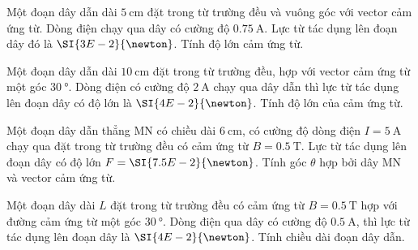 \begin{ex}
	Một đoạn dây dẫn dài $\SI{5}{\centi\meter}$ đặt trong từ trường đều và vuông góc với vector cảm ứng từ. Dòng điện chạy qua dây có cường độ $\SI{0.75}{\ampere}$. Lực từ tác dụng lên đoạn dây đó là $\SI{3E-2}{\newton}$. Tính độ lớn cảm ứng từ.
\end{ex}
\begin{ex}
	Một đoạn dây dẫn dài $\SI{10}{\centi\meter}$ đặt trong từ trường đều, hợp với vector cảm ứng từ một góc $\SI{30}{\degree}$. Dòng điện có cường độ $\SI{2}{\ampere}$ chạy qua dây dẫn thì lực từ tác dụng lên đoạn dây có độ lớn là $\SI{4E-2}{\newton}$. Tính độ lớn của cảm ứng từ.
\end{ex}
\begin{ex}
	Một đoạn dây dẫn thẳng MN có chiều dài $\SI{6}{\centi\meter}$, có cường độ dòng điện $I=\SI{5}{\ampere}$ chạy qua đặt trong từ trường đều có cảm ứng từ $B=\SI{0.5}{\tesla}$. Lực từ tác dụng lên đoạn dây có độ lớn $F=\SI{7.5E-2}{\newton}$. Tính góc $\theta$ hợp bởi dây MN và vector cảm ứng từ.	
\end{ex}
\begin{ex}
	Một đoạn dây dài $L$ đặt trong từ trường đều có cảm ứng từ $B=\SI{0.5}{\tesla}$ hợp với đường cảm ứng từ một góc $\SI{30}{\degree}$. Dòng điện qua dây có cường độ $\SI{0.5}{\ampere}$, thì lực từ tác dụng lên đoạn dây là $\SI{4E-2}{\newton}$. Tính chiều dài đoạn dây dẫn.	
\end{ex}
